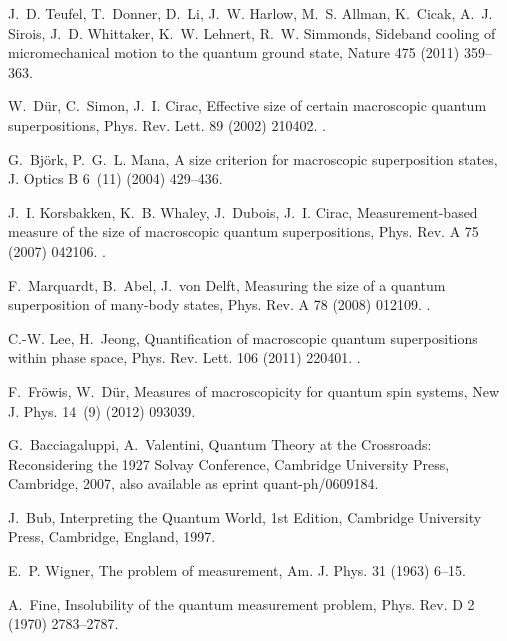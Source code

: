 \documentclass[3p,sort&compress]{elsarticle}
\begin{document}
\begin{thebibliography}{100}
J.~D. Teufel, T.~Donner, D.~Li, J.~W. Harlow, M.~S. Allman, K.~Cicak, A.~J.
  Sirois, J.~D. Whittaker, K.~W. Lehnert, R.~W. Simmonds, Sideband cooling of
  micromechanical motion to the quantum ground state, Nature 475 (2011)
  359--363.

W.~D\"ur, C.~Simon, J.~I. Cirac, Effective size of certain macroscopic quantum
  superpositions, Phys. Rev. Lett. 89 (2002) 210402.
\newblock \href {http://dx.doi.org/10.1103/PhysRevLett.89.210402}
  {}.

G.~Bj{\"o}rk, P.~G.~L. Mana, A size criterion for macroscopic superposition
  states, J. Optics B 6~(11) (2004) 429--436.

J.~I. Korsbakken, K.~B. Whaley, J.~Dubois, J.~I. Cirac, Measurement-based
  measure of the size of macroscopic quantum superpositions, Phys. Rev. A 75
  (2007) 042106.
\newblock \href {http://dx.doi.org/10.1103/PhysRevA.75.042106}
  {}.

F.~Marquardt, B.~Abel, J.~von Delft, Measuring the size of a quantum
  superposition of many-body states, Phys. Rev. A 78 (2008) 012109.
\newblock \href {http://dx.doi.org/10.1103/PhysRevA.78.012109}
  {}.

C.-W. Lee, H.~Jeong, Quantification of macroscopic quantum superpositions
  within phase space, Phys. Rev. Lett. 106 (2011) 220401.
\newblock \href {http://dx.doi.org/10.1103/PhysRevLett.106.220401}
  {}.

F.~Fr{\"o}wis, W.~D{\"u}r, Measures of macroscopicity for quantum spin systems,
  New J. Phys. 14~(9) (2012) 093039.

G.~Bacciagaluppi, A.~Valentini, Quantum Theory at the Crossroads: Reconsidering
  the 1927 Solvay Conference, Cambridge University Press, Cambridge, 2007, also
  available as eprint quant-ph/0609184.

J.~Bub, Interpreting the Quantum World, 1st Edition, Cambridge University
  Press, Cambridge, England, 1997.

E.~P. Wigner, The problem of measurement, Am. J. Phys. 31 (1963) 6--15.

A.~Fine, Insolubility of the quantum measurement problem, Phys. Rev. D 2 (1970)
  2783--2787.


\end{thebibliography}
\end{document}
